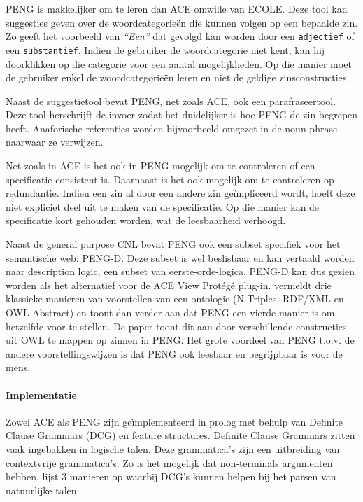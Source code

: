 \documentclass[]{article}
\theoremstyle{definition}
\newcommand{\example}[1]{\textit{``#1''}}
\begin{document}
PENG is makkelijker om te leren dan ACE omwille van ECOLE\cite{Schwitter2003}. Deze tool kan suggesties geven over de woordcategorieën die kunnen volgen op een bepaalde zin. Zo geeft \cite{Schwitter2003} het voorbeeld van \example{Een} dat gevolgd kan worden door een \texttt{adjectief} of een \texttt{substantief}. Indien de gebruiker de woordcategorie niet kent, kan hij doorklikken op die categorie voor een aantal mogelijkheden. Op die manier moet de gebruiker enkel de woordcategorieën leren en niet de geldige zinsconstructies.

Naast de suggestietool bevat PENG, net zoals ACE, ook een parafraseertool. Deze tool herschrijft de invoer zodat het duidelijker is hoe PENG de zin begrepen heeft. Anaforische referenties worden bijvoorbeeld omgezet in de noun phrase naarwaar ze verwijzen.

Net zoals in ACE is het ook in PENG mogelijk om te controleren of een specificatie consistent is\cite{Schwitter2004b}. Daarnaast is het ook mogelijk om te controleren op redundantie. Indien een zin al door een andere zin geïmpliceerd wordt, hoeft deze niet expliciet deel uit te maken van de specificatie. Op die manier kan de specificatie kort gehouden worden, wat de leesbaarheid verhoogd.

Naast de general purpose CNL bevat PENG ook een subset specifiek voor het semantische web: PENG-D\cite{Schwitter2004}. Deze subset is wel beslisbaar en kan vertaald worden naar description logic, een subset van eerste-orde-logica. PENG-D kan dus gezien worden als het alternatief voor de ACE View Protégé plug-in.
\cite{Schwitter2006} vermeldt drie klassieke manieren van voorstellen van een ontologie (N-Triples, RDF/XML en OWL Abstract) en toont dan verder aan dat PENG een vierde manier is om hetzelfde voor te stellen. De paper toont dit aan door verschillende constructies uit OWL te mappen op zinnen in PENG. Het grote voordeel van PENG t.o.v. de andere voorstellingswijzen is dat PENG ook leesbaar en begrijpbaar is voor de mens.

\paragraph{Implementatie} Zowel ACE als PENG zijn geïmplementeerd in prolog met behulp van Definite Clause Grammars (DCG) en feature structures\cite{Fuchs2008, Schwitter2006}. Definite Clause Grammars\cite{Pereira1980} zitten vaak ingebakken in logische talen. Deze grammatica's zijn een uitbreiding van contextvrije grammatica's. Zo is het mogelijk dat non-terminals argumenten hebben. \cite{Pereira1980} lijst 3 manieren op waarbij DCG's kunnen helpen bij het parsen van natuurlijke talen:
\end{document}
